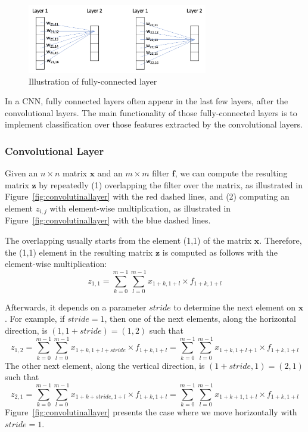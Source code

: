 \begin{figure}[!htbp]
    \centering
    \includegraphics[width=0.7\textwidth]{images/deepLearning/CNN/fully-connected.png}
    \caption{Illustration of fully-connected layer}
    \label{fig:fully-connected}
\end{figure}

In a CNN, fully connected layers often appear in the last few layers, after the convolutional layers. The main functionality of those fully-connected layers is to implement classification over those features extracted by the convolutional layers.  
 

\subsubsection{Convolutional Layer}

Given an $n\times n$ matrix $\textbf{x}$ and an $m\times m$ filter $\textbf{f}$, we can compute the resulting matrix $\textbf{z}$ by repeatedly (1) overlapping the filter over the matrix, as illustrated in Figure~\ref{fig:convolutinallayer} with the red dashed lines,  and (2) computing an element $z_{i,j}$ with element-wise multiplication, as illustrated in Figure~\ref{fig:convolutinallayer} with the blue dashed lines.

The overlapping usually starts from the element (1,1) of the matrix $\textbf{x}$. Therefore, the (1,1) element in the resulting matrix $\textbf{z}$ is computed as follows with the element-wise multiplication: 
\begin{equation}
    z_{1,1} = \sum_{k=0}^{m-1}\sum_{l=0}^{m-1} x_{1+k,1+l}\times f_{1+k,1+l}
\end{equation}

Afterwards, it depends on a parameter $stride$ to determine the next element on $\textbf{x}$. For example, if $stride=1$, then one of the next elements, along the horizontal direction, is $(1,1+stride)= (1,2)$ such that  
\begin{equation}
    z_{1,2} = \sum_{k=0}^{m-1}\sum_{l=0}^{m-1} x_{1+k,1+l+stride}\times f_{1+k,1+l}= \sum_{k=0}^{m-1}\sum_{l=0}^{m-1} x_{1+k,1+l+1}\times f_{1+k,1+l}
\end{equation}
The other next element, along the vertical direction, is $(1+stride,1)= (2,1)$ such that  
\begin{equation}
    z_{2,1} = \sum_{k=0}^{m-1}\sum_{l=0}^{m-1} x_{1+k+stride,1+l}\times f_{1+k,1+l}= \sum_{k=0}^{m-1}\sum_{l=0}^{m-1} x_{1+k+1,1+l}\times f_{1+k,1+l}
\end{equation}
Figure~\ref{fig:convolutinallayer} presents the case where we move horizontally with $stride=1$. 

